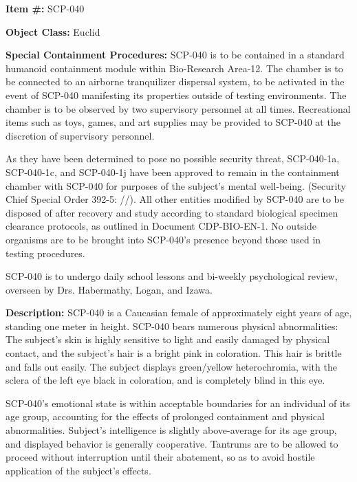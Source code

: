 
\textbf{Item \#:} SCP-040

\textbf{Object Class:} Euclid

\textbf{Special Containment Procedures:} SCP-040 is to be contained in a standard humanoid containment module within Bio-Research Area-12. The chamber is to be connected to an airborne tranquilizer dispersal system, to be activated in the event of SCP-040 manifesting its properties outside of testing environments. The chamber is to be observed by two supervisory personnel at all times. Recreational items such as toys, games, and art supplies may be provided to SCP-040 at the discretion of supervisory personnel.

As they have been determined to pose no possible security threat, SCP-040-1a, SCP-040-1c, and SCP-040-1j have been approved to remain in the containment chamber with SCP-040 for purposes of the subject’s mental well-being. (Security Chief Special Order 392-5: //). All other entities modified by SCP-040 are to be disposed of after recovery and study according to standard biological specimen clearance protocols, as outlined in Document CDP-BIO-EN-1. No outside organisms are to be brought into SCP-040’s presence beyond those used in testing procedures.

SCP-040 is to undergo daily school lessons and bi-weekly psychological review, overseen by Drs. Habermathy, Logan, and Izawa.

\textbf{Description:} SCP-040 is a Caucasian female of approximately eight years of age, standing one meter in height. SCP-040 bears numerous physical abnormalities: The subject’s skin is highly sensitive to light and easily damaged by physical contact, and the subject’s hair is a bright pink in coloration. This hair is brittle and falls out easily. The subject displays green/yellow heterochromia, with the sclera of the left eye black in coloration, and is completely blind in this eye.

SCP-040’s emotional state is within acceptable boundaries for an individual of its age group, accounting for the effects of prolonged containment and physical abnormalities. Subject’s intelligence is slightly above-average for its age group, and displayed behavior is generally cooperative. Tantrums are to be allowed to proceed without interruption until their abatement, so as to avoid hostile application of the subject’s effects.

